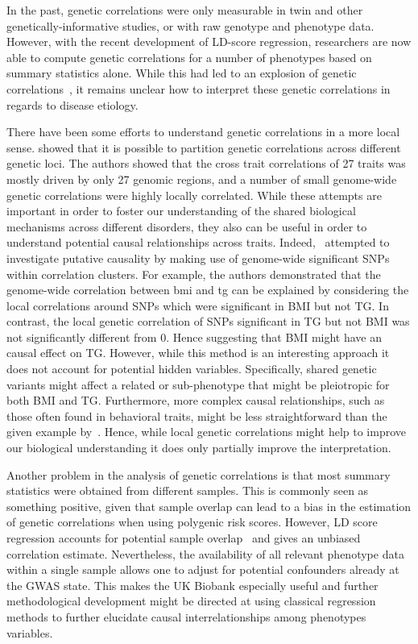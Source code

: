 In the past, genetic correlations were only measurable in twin and other genetically-informative studies, or with  raw genotype and phenotype data.
However, with the recent development of LD-score regression, researchers are now able to compute genetic correlations for     a number of phenotypes based on summary statistics alone.
While this had led to an explosion of genetic correlations~\cite{Bulik-Sullivan2015b,Bulik-Sullivan2015a}, it remains unclear how to interpret these genetic correlations in regards to disease etiology.

There have been some efforts to understand genetic correlations in a more local sense.
\citet{Shi2016a} showed that it is possible to partition genetic correlations across different genetic loci.
The authors showed that the cross trait correlations of 27 traits was mostly driven by only 27 genomic regions, and a number of small genome-wide genetic correlations were highly locally correlated.
While these attempts are important in order to foster our understanding of the shared biological mechanisms across different disorders, they also can be useful in order to understand potential causal relationships across traits.
Indeed,~\citet{Shi2016a} attempted to investigate putative causality by making use of genome-wide significant SNPs within correlation clusters.
For example, the authors demonstrated that the genome-wide correlation between \acrfull{bmi} and \acrfull{tg} can be explained by considering the local correlations around SNPs which were significant in BMI but not TG\@.
In contrast, the local genetic correlation of SNPs significant in TG  but not BMI was not significantly different from $0$.
Hence suggesting that BMI might have an causal effect on TG\@.
However, while this method is an interesting approach it does not account for potential hidden variables.
Specifically, shared genetic variants might affect a related or sub-phenotype that might be pleiotropic for both BMI and TG\@.
Furthermore, more complex causal relationships, such as those often found in behavioral traits, might be less straightforward than the given example by~\citet{Shi2016a}.
Hence, while local genetic correlations might help to improve our biological understanding it does only partially improve the interpretation.

Another problem in the analysis of genetic correlations is that most summary statistics were obtained from different samples.
This is commonly seen as something positive, given that sample overlap can lead to a bias in the estimation of genetic correlations when using polygenic risk scores. 
However, LD score regression accounts for potential sample overlap~\cite{Bulik-Sullivan2015a} and gives an unbiased correlation estimate.  
Nevertheless, the availability of all relevant phenotype data within a single sample allows one to adjust for potential confounders already at the GWAS state.
This makes the UK Biobank especially useful and further methodological development might be directed at using classical regression methods to further elucidate causal interrelationships among phenotypes variables.


